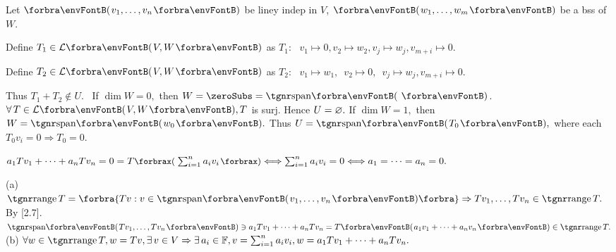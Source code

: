 \par\quad
Let $\Par{v_1,\dots,v_n}$ be liney indep in $V$, $\Par{w_1,\dots,w_m}$ be a bss of $W$. \par\quad
Define $T_1\in\Lm{V,W}$ as $T_1:\,\,\,\,v_1\mapsto 0,$\qquad$v_2\mapsto w_2,$\qquad$v_j\mapsto w_j,$\qquad$v_{m+i}\mapsto 0.$\par\quad
Define $T_2\in\Lm{V,W}$ as $T_2:\,\,\,\,v_1\mapsto w_1,$\,\,\,\quad$v_2\mapsto 0,$\,\,\,\qquad$v_j\mapsto w_j,$\qquad$v_{m+i}\mapsto 0.$\par\quad
{} Thus $T_1+T_2\not\in U.$\PfEnd\vspace{2pt}
\Comment \,\,\,If $\dim W=0,$ then $W=\zeroSubs=\Span{\,}$. $\forall\,T\in\Lm{V,W}, T$ is surj. Hence $U=\varnothing.$\parCom
If $\dim W=1,$ then $W=\Span{w_0}.$ Thus $U=\Span{T_0},$ where each $T_0v_i=0\Rightarrow T_0=0.$\SepLine\pagebreak

$a_1 Tv_1+\dots+a_n Tv_n=0=T\XPar{\sum_{i=1}^n a_i v_i}\Longleftrightarrow \sum_{i=1}^n a_i v_i=0\Longleftrightarrow a_1=\dots=a_n=0.$\PfEnd
\SepLine

 {
}(a) $\range T=\Bra{Tv:v\in\Span{v_1,\dots,v_n}}\Rightarrow Tv_1,\dots,Tv_n\in\range T.$ By [2.7].\parSol{\Ha}
\Or $\Span{Tv_1,\dots,Tv_n}\ni a_1 Tv_1+\dots+a_n Tv_n=T\Par{a_1 v_1+\dots+a_n v_n}\in\range T.$\parSol{}
(b) $\forall w\in\range T,w=Tv,\exists\,v\in V\Rightarrow\exists\,a_i\in\Fbb,v=\sum_{i=1}^na_i v_i,w=a_1 Tv_1+\dots+a_n Tv_n.$\PfEnd
\SepLine


